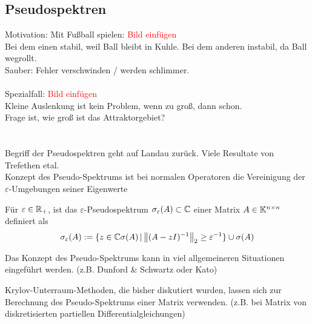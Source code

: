 \subsection{Pseudospektren}
Motivation:
Mit Fußball spielen: \textcolor{red}{Bild einfügen} \\
Bei dem einen stabil, weil Ball bleibt in Kuhle. Bei dem anderen instabil, da Ball wegrollt.
\\
Sauber: Fehler verschwinden / werden schlimmer. \\ \\
Spezialfall: \textcolor{red}{Bild einfügen} \\
Kleine Auslenkung ist kein Problem, wenn zu groß, dann schon. \\
Frage ist, wie groß ist das Attraktorgebiet? \\ \\ \\

Begriff der Pseudospektren geht auf Landau zurück. Viele Resultate von Trefethen etal. \\
Konzept des Pseudo-Spektrums ist bei normalen Operatoren die Vereinigung der $\varepsilon$-Umgebungen seiner Eigenwerte

\begin{defbox}
  Für $\varepsilon\in\mathbb R_+$, ist das $\varepsilon$-Pseudospektrum $\sigma_\varepsilon(A)\subset\mathbb C  $ 
  einer Matrix $A\in\mathbb K^{n\times n}$ definiert als 
  \begin{align*}
    \sigma_\varepsilon(A) := \{z\in\C  \sigma(A)\,|\, \vertn{2}{(A-zI)^{-1}}_2\geq \varepsilon^{-1}\} \cup \sigma(A)
  \end{align*}
\end{defbox}

\begin{rembox}
  Das Konzept des Pseudo-Spektrums kann in viel allgemeineren Situationen eingeführt werden. 
  (z.B. Dunford \& Schwartz oder Kato)
\end{rembox}

\begin{rembox}
  Krylov-Unterraum-Methoden, die bisher diskutiert wurden, lassen sich zur Berechnung des Pseudo-Spektrums einer 
  Matrix verwenden. (z.B. bei Matrix von diskretisierten partiellen Differentialgleichungen)
\end{rembox}


